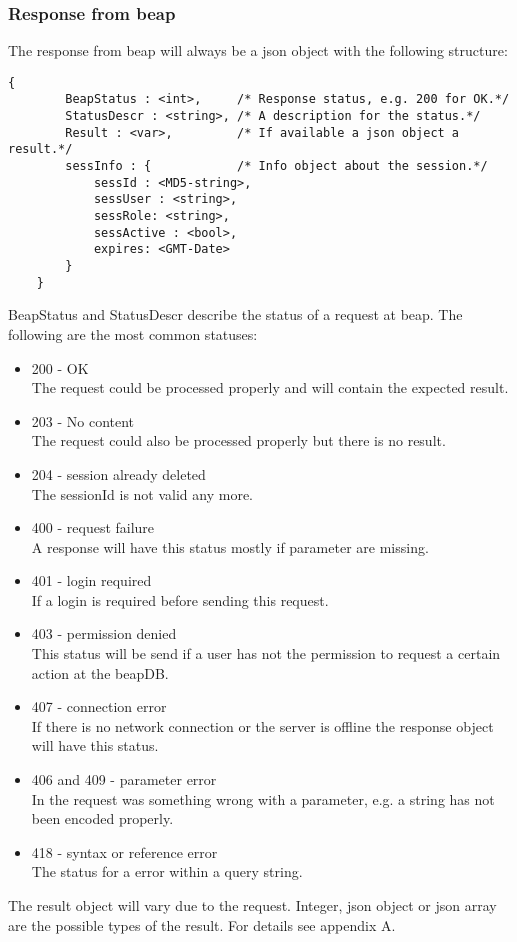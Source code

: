 \documentclass[12pt,a4paper,oneside]{report}
\begin{document}
\subsubsection{Response from beap}
The response from beap will always be a json object with the following structure: 
\lstset{language=JavaScript}
\begin{lstlisting}
{
		BeapStatus : <int>, 	/* Response status, e.g. 200 for OK.*/
		StatusDescr : <string>, /* A description for the status.*/
		Result : <var>,         /* If available a json object a result.*/
		sessInfo : {			/* Info object about the session.*/
			sessId : <MD5-string>,
			sessUser : <string>,
			sessRole: <string>,
			sessActive : <bool>,
			expires: <GMT-Date>  
		}
	}
\end{lstlisting}
\lstset{language=java}
BeapStatus and StatusDescr describe the status of a request at beap. The following are the most common statuses:
\begin{itemize}
\item{200 - OK}
\\The request could be processed properly and will contain the expected result.
\item{203 - No content}
\\The request could also be processed properly but there is no result.
\item{204 - session already deleted}
\\The sessionId is not valid any more.
\item{400 - request failure}
\\A response will have this status mostly if parameter are missing.
\item{401 - login required}
\\If a login is required before sending this request.
\item{403 - permission denied}
\\This status will be send if a user has not the permission to request a certain action at the beapDB.
\item{407 - connection error}
\\If there is no network connection or the server is offline the response object will have this status.
\item{406 and 409 - parameter error}
\\In the request was something wrong with a parameter, e.g. a string has not been encoded properly.
\item{418 - syntax or reference error}
\\The status for a error within a query string.
\end{itemize}
The result object will vary due to the request. Integer, json object or json array are the possible types of the result. 
For details see appendix A.
\end{document}
